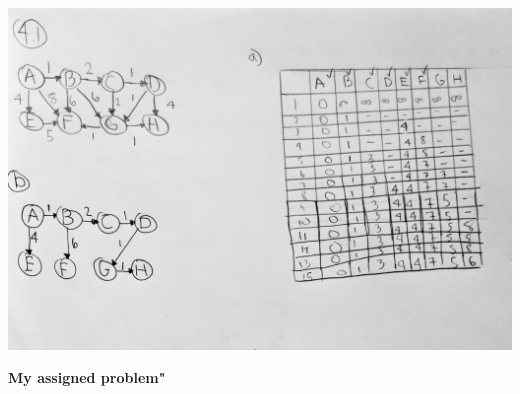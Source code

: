 \documentclass{article}
\begin{document}
\begin{center}
	   \includegraphics[scale=0.2]{4.jpg} \\ 
	   \end{center}
 \textbf{My assigned problem"}
\end{document}
